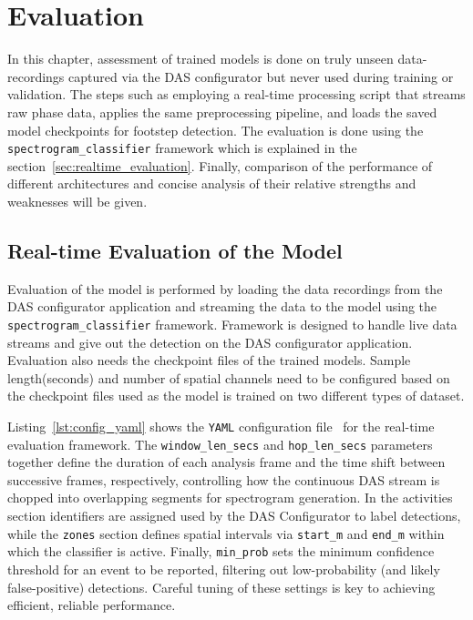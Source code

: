 
\chapter{Evaluation}
\label{ch:evaluation}

In this chapter, assessment of trained models is done on truly unseen data-recordings captured via the DAS configurator but never used during training or validation. The steps such as employing a real-time processing script that streams raw phase data, applies the same preprocessing pipeline, and loads the saved model checkpoints for footstep detection. The evaluation is done using the \texttt{spectrogram\_classifier} framework which is explained in the section~\ref{sec:realtime_evaluation}. Finally, comparison of the performance of different architectures and concise analysis of their relative strengths and weaknesses will be given.

\section{Real-time Evaluation of the  Model}

Evaluation of the model is performed by loading the data recordings from the DAS configurator application and streaming the data to the model using the \texttt{spectrogram\_classifier} framework. Framework is designed to handle live data streams and give out the detection on the DAS configurator application. Evaluation also needs the checkpoint files of the trained models. Sample length(seconds) and number of spatial channels need to be configured based on the checkpoint files used as the model is trained on two different types of dataset. 

Listing~\ref{lst:config_yaml} shows the \texttt{YAML} configuration file~\cite{pyyaml} for the real-time evaluation framework. The \texttt{window\_len\_secs} and \texttt{hop\_len\_secs} parameters together define the duration of each analysis frame and the time shift between successive frames, respectively, controlling how the continuous DAS stream is chopped into overlapping segments for spectrogram generation. In the activities section identifiers are assigned used by the DAS Configurator to label detections, while the \texttt{zones} section defines spatial intervals via \texttt{start\_m} and \texttt{end\_m} within which the classifier is active. Finally, \texttt{min\_prob} sets the minimum confidence threshold for an event to be reported, filtering out low-probability (and likely false-positive) detections. Careful tuning of these settings is key to achieving efficient, reliable performance.


